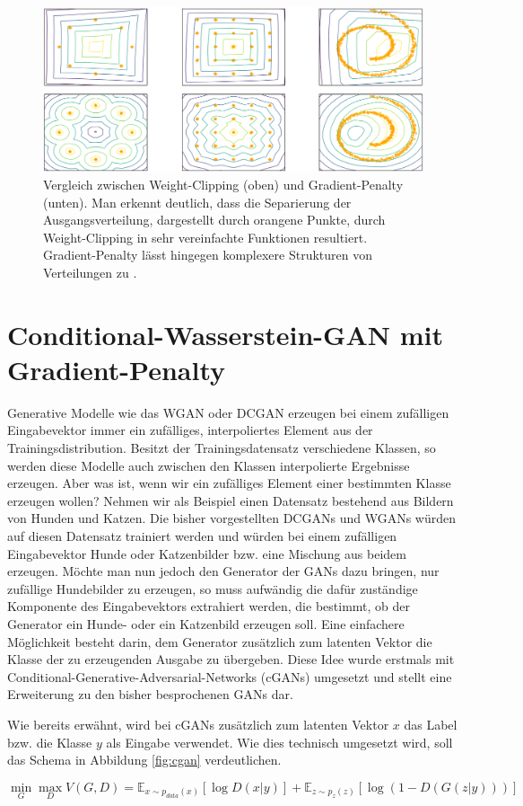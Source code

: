 \begin{figure}
\centering
\includegraphics[width=\textwidth]{images/problems_of_weight_clipping}
\caption{Vergleich zwischen Weight-Clipping (oben) und Gradient-Penalty
(unten). Man erkennt deutlich, dass die Separierung der Ausgangsverteilung,
dargestellt durch orangene Punkte, durch Weight-Clipping in sehr
vereinfachte Funktionen resultiert. Gradient-Penalty lässt hingegen
komplexere Strukturen von Verteilungen zu \cite{gulrajani2017improved}.}
\label{fig:problems-of-weight-clipping}
\end{figure}

\section{Conditional-Wasserstein-GAN mit Gradient-Penalty}
Generative Modelle wie das WGAN oder DCGAN erzeugen bei einem zufälligen
Eingabevektor immer ein zufälliges, interpoliertes Element aus der
Trainingsdistribution. Besitzt der Trainingsdatensatz verschiedene Klassen, so
werden diese Modelle auch zwischen den Klassen interpolierte Ergebnisse
erzeugen. Aber was ist, wenn wir ein zufälliges Element einer bestimmten Klasse
erzeugen wollen? Nehmen wir als Beispiel einen Datensatz bestehend aus Bildern
von Hunden und Katzen. Die bisher vorgestellten DCGANs und WGANs würden auf
diesen Datensatz trainiert werden und würden bei einem zufälligen Eingabevektor
Hunde oder Katzenbilder bzw. eine Mischung aus beidem erzeugen. Möchte man nun
jedoch den Generator der GANs dazu bringen, nur zufällige Hundebilder zu
erzeugen, so muss aufwändig die dafür zuständige Komponente des Eingabevektors
extrahiert werden, die bestimmt, ob der Generator ein Hunde- oder ein Katzenbild
erzeugen soll. Eine einfachere Möglichkeit besteht darin, dem Generator
zusätzlich zum latenten Vektor die Klasse der zu erzeugenden Ausgabe zu
übergeben. Diese Idee wurde erstmals mit
Conditional-Generative-Adversarial-Networks (cGANs) \cite{mirza2014conditional}
umgesetzt und stellt eine Erweiterung zu den bisher besprochenen GANs dar.

Wie bereits erwähnt, wird bei cGANs zusätzlich zum latenten Vektor $x$ das Label
bzw. die Klasse $y$ als Eingabe verwendet. Wie dies technisch umgesetzt wird,
soll das Schema in Abbildung \ref{fig:cgan} verdeutlichen.

\[
\min_G \max_D V(G, D) = \mathbb{E}_{x \sim p_{data}(x)}\left[ \log D(x \lvert y) \right] + \mathbb{E}_{z \sim p_z(z)}\left[ \log (1 - D(G(z \lvert y))) \right]
\]
